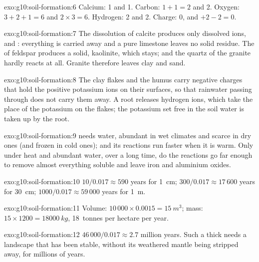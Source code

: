 \begin{solution}{exo:g10:soil-formation:6}
Calcium: 1 and 1. Carbon: $1 + 1 = 2$ and 2. Oxygen: $3 + 2 + 1 = 6$ and
$2 \times 3 = 6$. Hydrogen: 2 and 2. Charge: 0, and $+2 - 2 = 0$.
\end{solution}

\begin{solution}{exo:g10:soil-formation:7}
The dissolution of calcite produces only dissolved ions,  and
: everything is carried away and a pure limestone leaves no solid
residue. The  of feldspar produces a solid, kaolinite, which stays;
and the quartz of the granite hardly reacts at all. Granite therefore leaves
clay and sand.
\end{solution}

\begin{solution}{exo:g10:soil-formation:8}
The clay flakes and the humus carry negative charges that hold the positive
potassium ions  on their surfaces, so that rainwater passing through
does not carry them away. A root releases hydrogen ions, which take the place
of the potassium on the flakes; the potassium set free in the soil water is
taken up by the root.
\end{solution}

\begin{solution}{exo:g10:soil-formation:9}
 needs water, abundant in wet climates and scarce in dry
ones (and frozen in cold ones); and its reactions run faster when it is
warm. Only under heat and abundant water, over a long time, do the reactions
go far enough to remove almost everything soluble and leave iron and
aluminium oxides.
\end{solution}

\begin{solution}{exo:g10:soil-formation:10}
$10/0.017 \approx 590$ years for \qty{1}{cm}; $300/0.017 \approx 17\,600$
years for \qty{30}{cm}; $1000/0.017 \approx 59\,000$ years for \qty{1}{m}.
\end{solution}

\begin{solution}{exo:g10:soil-formation:11}
Volume: $10\,000 \times 0.0015 = \qty{15}{m^3}$; mass: $15 \times 1200 =
\qty{18000}{kg}$, \num{18}~tonnes per hectare per year.
\end{solution}

\begin{solution}{exo:g10:soil-formation:12}
$46\,000/0.017 \approx 2.7$ million years. Such a thick  needs a
landscape that has been stable, without its weathered mantle being stripped
away, for millions of years.
\end{solution}

